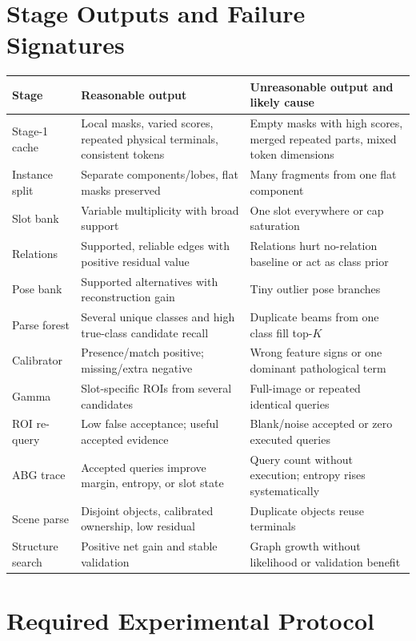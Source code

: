 \documentclass[11pt]{article}
\begin{document}
\section{Stage Outputs and Failure Signatures}

\begin{longtable}{p{}p{}p{}}
\toprule
Stage & Reasonable output & Unreasonable output and likely cause \\
\midrule
\endhead
Stage-1 cache & Local masks, varied scores, repeated physical terminals, consistent tokens & Empty masks with high scores, merged repeated parts, mixed token dimensions \\
Instance split & Separate components/lobes, flat masks preserved & Many fragments from one flat component \\
Slot bank & Variable multiplicity with broad support & One slot everywhere or cap saturation \\
Relations & Supported, reliable edges with positive residual value & Relations hurt no-relation baseline or act as class prior \\
Pose bank & Supported alternatives with reconstruction gain & Tiny outlier pose branches \\
Parse forest & Several unique classes and high true-class candidate recall & Duplicate beams from one class fill top-$K$ \\
Calibrator & Presence/match positive; missing/extra negative & Wrong feature signs or one dominant pathological term \\
Gamma & Slot-specific ROIs from several candidates & Full-image or repeated identical queries \\
ROI re-query & Low false acceptance; useful accepted evidence & Blank/noise accepted or zero executed queries \\
ABG trace & Accepted queries improve margin, entropy, or slot state & Query count without execution; entropy rises systematically \\
Scene parse & Disjoint objects, calibrated ownership, low residual & Duplicate objects reuse terminals \\
Structure search & Positive net gain and stable validation & Graph growth without likelihood or validation benefit \\
\bottomrule
\end{longtable}

\section{Required Experimental Protocol}
\end{document}
